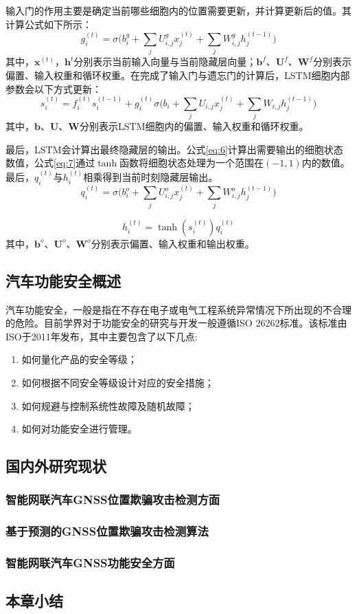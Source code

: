 输入门的作用主要是确定当前哪些细胞内的位置需要更新，并计算更新后的值。其计算公式如下所示：
\begin{equation}
    g_i^{(t)}=\sigma\bigg(b_i^g+\sum_jU_{i,j}^gx_j^{(t)}+\sum_jW_{i,j}^gh_j^{(t-1)}\bigg)
    \label{eq:4}
\end{equation}
其中，$\textbf{x}^{(t)}$，$\textbf{h}^t$分别表示当前输入向量与当前隐藏层向量；$\textbf{b}^f$、$\textbf{U}^f$、$\textbf{W}^f$分别表示偏置、输入权重和循环权重。在完成了输入门与遗忘门的计算后，LSTM细胞内部参数会以下方式更新：
\begin{equation}
    s_i^{(t)}=f_i^{(t)}s_i^{(t-1)}+g_i^{(t)}\sigma\bigg(b_i+\sum_jU_{i,j}x_j^{(t)}+\sum_jW_{i,j}h_j^{(t-1)}\bigg)
    \label{eq:5}
\end{equation}
其中，$\textbf{b}$、$\textbf{U}$、$\textbf{W}$分别表示LSTM细胞内的偏置、输入权重和循环权重。

最后，LSTM会计算出最终隐藏层的输出。公式\ref{eq:6}计算出需要输出的细胞状态数值，公式\ref{eq:7}通过$\tanh$函数将细胞状态处理为一个范围在$(-1,1)$内的数值。最后，$q_i^{(t)}$与$h_i^{(t)}$相乘得到当前时刻隐藏层输出。
\begin{equation}
    q_i^{(t)}=\sigma\bigg(b_i^o+\sum_jU^o_{i,j}x_j^{(t)}+\sum_jW_{i,j}^oh_j^{(t-1)}\bigg)
    \label{eq:6}
\end{equation}

\begin{equation}
    h_i^{(t)}=\tanh(s_i^{(t)})q_i^{(t)}
    \label{eq:7}
\end{equation}
其中，$\textbf{b}^o$、$\textbf{U}^o$、$\textbf{W}^o$分别表示偏置、输入权重和输出权重。

\subsection{汽车功能安全概述}
汽车功能安全，一般是指在不存在电子或电气工程系统异常情况下所出现的不合理的危险\cite{刘法旺2021自动驾驶系统功能安全与预期功能安全研究}。目前学界对于功能安全的研究与开发一般遵循ISO 26262标准。该标准由ISO于2011年发布，其中主要包含了以下几点\cite{iso_2018}:
\begin{enumerate}
    \item 如何量化产品的安全等级；
    \item 如何根据不同安全等级设计对应的安全措施；
    \item 如何规避与控制系统性故障及随机故障；
    \item 如何对功能安全进行管理。
\end{enumerate}


\subsection{国内外研究现状}
\subsubsection{智能网联汽车GNSS位置欺骗攻击检测方面}
\subsubsection{基于预测的GNSS位置欺骗攻击检测算法}
\subsubsection{智能网联汽车GNSS功能安全方面}
\subsection{本章小结}
